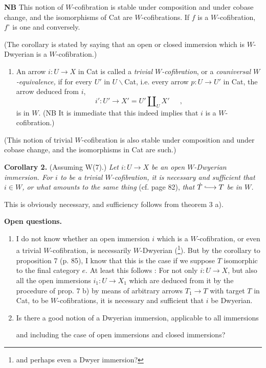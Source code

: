 \documentclass[11pt]{article}
\newcommand{\printedpage}[1]{\marginpar{\footnotesize p.~#1}}
\newcommand{\msp}[1]{\marginpar{\footnotesize [#1]}}
\newcommand{\hra}{\lhook\joinrel\longrightarrow}
\begin{document}
\textbf{NB} This notion of $W$-cofibration is stable under composition and under cobase change, and the isomorphisms of Cat are $W$-cofibrations. If $f$ is a $W$-cofibration, $f^\circ$ is one and conversely.

(The corollary is stated by saying that an open or closed immersion which is $W$-Dwyerian is a $W$-cofibration.)

\begin{enumerate}[label=\alph*), start=4]
\item An arrow $i:U\longrightarrow X$ in Cat is called a \textit{trivial $W$-cofibration}, or a \textit{couniversal $W$-equivalence,} if for every $U'$ in $U\backslash$Cat, i.e. every arrow $p:U\longrightarrow U'$ in Cat, the arrow deduced from $i$,
\[ i':U'\longrightarrow X'=U'\amalg_U X'\quad\ \ , \]
is in $W$. (NB It is immediate that this indeed implies that $i$ is a $W$-cofibration.)
\end{enumerate}

(This notion of trivial $W$-cofibration is also stable under composition and under cobase change, and the isomorphisms in Cat are such.)

\msp{page 111}

\textbf{Corollary 2.} (Assuming W(7).) \textit{Let $i:U\longrightarrow X$ be an open $W$-Dwyerian immersion. For $i$ to be a trivial $W$-cofibration, it is necessary and sufficient that $i\in W$, or what amounts to the same thing} (cf. page 82), \textit{that $\dot{T}\hra T$ be in $W$.}

This is obviously necessary, and sufficiency follows from theorem 3 a).

\textbf{Open questions.}

\begin{enumerate}[label=\alph*)]
\item I do not know whether an open immersion $i$ which is a $W$-cofibration, or even a trivial $W$-cofibration, is necessarily $W$-Dwyerian (\footnote{and perhaps even a Dwyer immersion?}). But by the corollary to proposition 7 (p. 85), I know that this is the case if we suppose $T$ isomorphic to the final category $e$. At least this follows : For not only $i:U\longrightarrow X$, but also all the open immersions $i_1:U\longrightarrow X_1$ which are deduced from it by the procedure of prop. 7 b) by means of arbitrary arrows $T_1\longrightarrow T$ with target $T$ in Cat, to be $W$-cofibrations, it is necessary and sufficient that $i$ be Dwyerian. %

\item \printedpage{77}
Is there a good notion of a Dwyerian immersion, applicable to all immersions

\msp{page 112}

and including the case of open immersions and closed immersions?
\end{enumerate}
\end{document}
